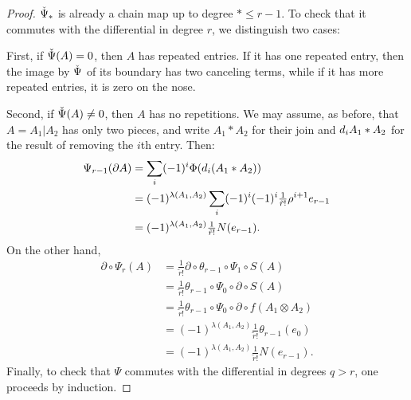 \begin{proof}
	$\operatorname{\check{\Psi}}_*$ is already a chain map up to degree $*\leq r-1$. To check that it commutes with the differential in degree $r$, we distinguish two cases: 
	
	First, if $\operatorname{\check{\Psi}}(A) = 0$, then $A$ has repeated entries. If it has one repeated entry, then the image by $\operatorname{\check{\Psi}}$ of its boundary has two canceling terms, while if it has more repeated entries, it is zero on the nose. 
	
	Second, if $\operatorname{\check{\Psi}}(A)\neq 0$, then $A$ has no repetitions. We may assume, as before, that $A = A_1|A_2$ has only two pieces, and write $A_1*A_2$ for their join and $d_iA_1*A_2$ for the result of removing the $i$th entry. Then:
	\begin{align*}
		\Psi_{r-1}(\partial A) 
		&= \sum_i (-1)^i \Phi(d_i(A_1*A_2)) 
		\\
		&= (-1)^{\lambda(A_1,A_2)}\sum_i (-1)^i(-1)^{i}{\textstyle\frac{1}{\tilde{r}!}}\rho^{i+1} e_{r-1} 
		\\
		&= (-1)^{\lambda(A_1,A_2)} {\textstyle\frac{1}{\tilde{r}!}} N(e_{r-1}).
	\end{align*}
	On the other hand,
	\begin{align*}
		\partial \circ \Psi_r(A) &= {\textstyle\frac{1}{\tilde{r}!}}\partial \circ \theta_{r-1}\circ \Psi_1\circ S(A)
		\\
		&= {\textstyle\frac{1}{\tilde{r}!}}\theta_{r-1}\circ \Psi_0\circ \partial\circ S(A)
		\\
		&= {\textstyle\frac{1}{\tilde{r}!}}\theta_{r-1}\circ \Psi_0\circ \partial\circ f(A_1\otimes A_2)
		\\
		&= (-1)^{\lambda(A_1,A_2)}{\textstyle\frac{1}{\tilde{r}!}} \theta_{r-1}(e_0)
		\\
		&= (-1)^{\lambda(A_1,A_2)}{\textstyle\frac{1}{\tilde{r}!}} N(e_{r-1}).
	\end{align*}
	Finally, to check that $\Psi$ commutes with the differential in degrees $q>r$, one proceeds by induction.
\end{proof}

